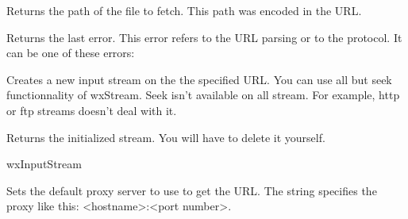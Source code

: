 
Returns the path of the file to fetch. This path was encoded in the URL.

%
%


Returns the last error. This error refers to the URL parsing or to the protocol.
It can be one of these errors:

\twocolwidtha{7cm}
\begin{twocollist}\itemsep=0pt%
\end{twocollist}%

%
%


Creates a new input stream on the the specified URL. You can use all but seek
functionnality of wxStream. Seek isn't available on all stream. For example,
http or ftp streams doesn't deal with it.


Returns the initialized stream. You will have to delete it yourself.


wxInputStream

%
%
\label{wxurlsetdefaultproxy}


Sets the default proxy server to use to get the URL. The string specifies
the proxy like this: <hostname>:<port number>.






